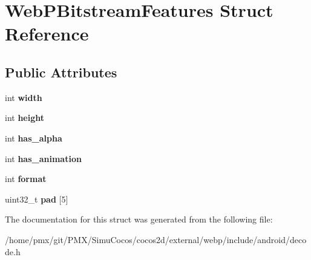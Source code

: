 \hypertarget{structWebPBitstreamFeatures}{}\section{Web\+P\+Bitstream\+Features Struct Reference}
\label{structWebPBitstreamFeatures}
\subsection*{Public Attributes}
\begin{DoxyCompactItemize}
\item 
\mbox{\label{structWebPBitstreamFeatures_a2ca102ea828b5b58d03138e059890c5e}} 
int {\bfseries width}
\item 
\mbox{\label{structWebPBitstreamFeatures_a4ee49132795b6676be92169299a25b8b}} 
int {\bfseries height}
\item 
\mbox{\label{structWebPBitstreamFeatures_a2ec4519a9dfbc065e476b666f9007678}} 
int {\bfseries has\+\_\+alpha}
\item 
\mbox{\label{structWebPBitstreamFeatures_a32f334eb42ab91a957b40786cfad1bfa}} 
int {\bfseries has\+\_\+animation}
\item 
\mbox{\label{structWebPBitstreamFeatures_ac89999be3b50d8949fcf24f204848ffe}} 
int {\bfseries format}
\item 
\mbox{\label{structWebPBitstreamFeatures_a6b63b2a4eabcbec3356d99cc8f59347d}} 
uint32\+\_\+t {\bfseries pad} \mbox{[}5\mbox{]}
\end{DoxyCompactItemize}


The documentation for this struct was generated from the following file\+:\begin{DoxyCompactItemize}
\item 
/home/pmx/git/\+P\+M\+X/\+Simu\+Cocos/cocos2d/external/webp/include/android/decode.\+h\end{DoxyCompactItemize}
